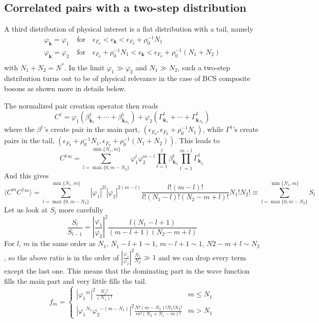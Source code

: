 \documentclass[aps,prb,preprint,groupedaddress,amsmath]{revtex4-1}
\newcommand{\vk}{\ensuremath{\mathbf{k}}}
\newcommand{\dg}{\ensuremath{\dagger}}
\begin{document}
\subsection{Correlated pairs with a two-step distribution}
A third distribution of physical interest is a flat distribution with a tail, namely
\begin{equation}
 \begin{split}
  \varphi_\vk=\varphi_1&\; \mbox{for}\quad{}\epsilon_{F_0}<\epsilon_\vk<\epsilon_{F_0}+\rho_0^{-1}N_1\\
  \varphi_\vk=\varphi_2&\; \mbox{for}\quad{}\epsilon_{F_0}+\rho_0^{-1}N_1<\epsilon_\vk<\epsilon_{F_0}+\rho_0^{-1}(N_1+N_2)\\
 \end{split}
\end{equation}
with $N_1+N_2=N^*$. In the limit $\varphi_1\gg\varphi_2$ and $N_1\gg{}N_2$, such a two-step distribution turns out to be of physical relevance in the case of BCS composite bosons as shown more in details below. 

The normalized pair creation operator then reads
\begin{equation}
C^\dg=\varphi_1(\beta^\dg_{\vk_1}+\cdots+\beta^\dg_{\vk_{N_1}})+\varphi_2(\Gamma^\dg_{\vk_{1}}+\cdots+\Gamma^\dg_{\vk_{N_2}})
\end{equation}
where the $\beta^\dg$'s create pair in the main part, $(\epsilon_{F_0},\epsilon_{F_0}+\rho_0^{-1}N_1)$, while $\Gamma^\dg$'s create pairs in the tail, $(\epsilon_{F_0}+\rho_0^{-1}N_1,\epsilon_{F_0}+\rho_0^{-1}(N_1+N_2))$.
This leads to\begin{equation}
C^\dg{}^m=\sum_{l=\max\{0,m-N_2\}}^{\min\{N_1,m\}}\varphi_1^l\varphi_2^{m-l}\prod_{t=1}^{l}\beta^\dg_{\vk_{i_t}}\prod_{t^\prime=1}^{m-l}\Gamma^\dg_{\vk_{j_{t^\prime}}}
\end{equation}
And this gives
\begin{equation}
\langle{}C^mC^\dg{}^m\rangle=\sum_{l=\max\{0,m-N_2\}}^{\min\{N_1,m\}}|\varphi_1|^{2l}|\varphi_2|^{2(m-l)}
\frac{l!(m-l)!}{l!(N_1-l)!(N_2-m+l)!}N_1!N_2!\equiv\sum_{l=\max\{0,m-N_2\}}^{\min\{N_1,m\}}S_l
\end{equation}
Let us look at $S_l$ more carefully
\begin{equation}
\frac{S_l}{S_{l-1}}=\left|\frac{\varphi_1}{\varphi_2}\right|^2\frac{l(N_1-l+1)}{(m-l+1)(N_2-m+l)}
\end{equation}
For $l$, $m$ in the same order as $N_1$, $N_1-l+1\sim1$, $m-l+1\sim1$, $N2-m+l\sim{N_2}$, so the above ratio is in the order of $\left|\frac{\varphi_1}{\varphi_2}\right|^2\frac{N_1}{N_2}\gg1$ and we can drop every term except the last one. This means that the dominating part in the wave function fills the main part and very little fills the tail.  
\begin{equation}
f_m=
\begin{cases}
\left|{\varphi_1}^{m}\right|^2\frac{N_1!}{(N_1)!}&m\leq{}N_1\\
\left|{\varphi_1}^{N_1}{\varphi_2}^{-(m-N_1)}\right|^2\frac{N!(m-N_1)!N_1!N_2!}{m!(N_2+N_1-m)!}&m>N_1
\end{cases}
\end{equation}
\end{document}

